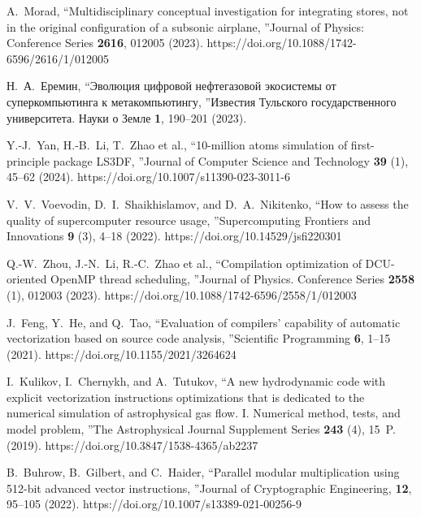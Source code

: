 \documentclass[
11pt,%
tightenlines,%
twoside,%
onecolumn,%
nofloats,%
nobibnotes,%
nofootinbib,%
superscriptaddress,%
noshowpacs,%
centertags]%
{revtex4}
\begin{document}
\begin{thebibliography}{99}
A.~Morad, \textquotedblleft Multidisciplinary conceptual investigation for integrating stores, not in the original configuration of a subsonic airplane, \textquotedblright Journal of Physics: Conference Series \textbf{2616}, 012005 (2023). https://doi.org/10.1088/1742-6596/2616/1/012005

Н.~А.~Еремин, \textquotedblleft Эволюция цифровой нефтегазовой экосистемы от суперкомпьютинга к метакомпьютингу, \textquotedblright Известия Тульского государственного университета. Науки о Земле \textbf{1}, 190--201 (2023).

Y.-J.~Yan, H.-B.~Li, T.~Zhao et al., \textquotedblleft 10-million atoms simulation of first-principle package LS3DF, \textquotedblright Journal of Computer Science and Technology \textbf{39} (1), 45--62 (2024). https://doi.org/10.1007/s11390-023-3011-6

V.~V.~Voevodin, D.~I.~Shaikhislamov, and D.~A.~Nikitenko, \textquotedblleft How to assess the quality of supercomputer resource usage, \textquotedblright Supercomputing Frontiers and Innovations \textbf{9} (3), 4--18 (2022). https://doi.org/10.14529/jsfi220301

Q.-W.~Zhou, J.-N.~Li, R.-C.~Zhao et al., \textquotedblleft Compilation optimization of DCU-oriented OpenMP thread scheduling, \textquotedblright Journal of Physics. Conference Series \textbf{2558} (1), 012003 (2023). https://doi.org/10.1088/1742-6596/2558/1/012003

J.~Feng, Y.~He, and Q.~Tao, \textquotedblleft Evaluation of compilers’ capability of automatic vectorization based on source code analysis, \textquotedblright Scientific Programming \textbf{6}, 1--15 (2021). https://doi.org/10.1155/2021/3264624


I.~Kulikov, I.~Chernykh, and A.~Tutukov, \textquotedblleft A new hydrodynamic code with explicit vectorization instructions optimizations that is dedicated to the numerical simulation of astrophysical gas flow. I. Numerical method, tests, and model problem, \textquotedblright The Astrophysical Journal Supplement Series \textbf{243} (4), 15~P. (2019). https://doi.org/10.3847/1538-4365/ab2237

B.~Buhrow, B.~Gilbert, and C.~Haider, \textquotedblleft Parallel modular multiplication using 512-bit advanced vector instructions, \textquotedblright Journal of Cryptographic Engineering, \textbf{12}, 95--105 (2022). https://doi.org/10.1007/s13389-021-00256-9


\end{thebibliography}
\end{document}
